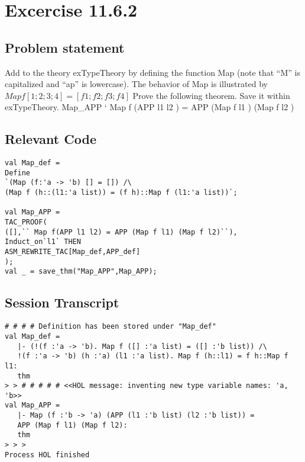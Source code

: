 \documentclass{report}
\begin{document}
\chapter{Excercise 11.6.2}
\label{cha:11.6.2}

\section{Problem statement}
\label{problem-statement-11-6-2}
Add to the theory exTypeTheory by defining the function Map (note that “M” is capitalized and “ap” is lowercase). The behavior of Map is illustrated by
$Map f [1;2;3;4] = [f1;f2;f3;f4]$
Prove the following theorem. Save it within exTypeTheory.
Map_APP
` Map f (APP l1 l2 ) = APP (Map f l1 ) (Map f l2 )
\section{Relevant Code}
\label{rel-code-11-6-2}
\begin{lstlisting}[frame=TBlr]
val Map_def =
Define
`(Map (f:'a -> 'b) [] = []) /\
(Map f (h::(l1:'a list)) = (f h)::Map f (l1:'a list))`;

val Map_APP =
TAC_PROOF(
([],`` Map f(APP l1 l2) = APP (Map f l1) (Map f l2)``),
Induct_on`l1` THEN
ASM_REWRITE_TAC[Map_def,APP_def]
);
val _ = save_thm("Map_APP",Map_APP);
\end{lstlisting}

\section{Session Transcript}
\label{trans-11-6-2}

\begin{session}
  \begin{scriptsize}
\begin{verbatim}
# # # # Definition has been stored under "Map_def"
val Map_def =
   |- (!(f :'a -> 'b). Map f ([] :'a list) = ([] :'b list)) /\
   !(f :'a -> 'b) (h :'a) (l1 :'a list). Map f (h::l1) = f h::Map f l1:
   thm
> > # # # # # <<HOL message: inventing new type variable names: 'a, 'b>>
val Map_APP =
   |- Map (f :'b -> 'a) (APP (l1 :'b list) (l2 :'b list)) =
   APP (Map f l1) (Map f l2):
   thm
> > > 
Process HOL finished

\end{verbatim}
  \end{scriptsize}
\end{session}
\end{document}
